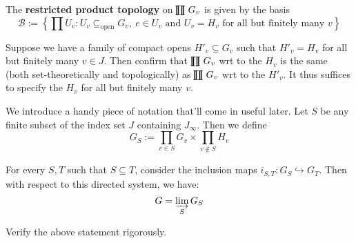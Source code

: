 \documentclass[11pt, x11names]{article}
\newcommand{\calb}{\mathcal{B}}
\newcommand{\inj}{\hookrightarrow}
\newcommand{\dlim}{\varinjlim}
\newcommand{\set}[1]{\left\{ #1 \right\}}
\newcommand{\rprod}{
    \mathrel{\ooalign{\hidewidth $\prod$ \hidewidth \cr $\coprod$}}
}
\begin{document}
\begin{defn}
    The \textbf{restricted product topology} on $\rprod G_v$ is given by the basis
    \begin{equation*}
        \calb := \set{\prod U_v : U_v \subseteq_{\text{open}} G_v, \ e \in U_v \text{ and } U_v = H_v \text{ for all but finitely many } v}
    \end{equation*}
\end{defn}

\begin{sanitycheck}
Suppose we have a family of compact opens $H'_v \subseteq G_v$ such that $H'_v = H_v$ for all but finitely many $v \in J$. Then confirm that $\rprod G_v$ wrt to the $H_v$ is the same (both set-theoretically and topologically) as $\rprod G_v$ wrt to the $H'_v$. It thus suffices to specify the $H_v$ for all but finitely many $v$.
\end{sanitycheck}

We introduce a handy piece of notation that'll come in useful later. Let $S$ be any finite subset of the index set $J$ containing $J_\infty$. Then we define
\begin{equation*}
    G_S := \prod_{v \in S} G_v \times \prod_{v \notin S} H_v
\end{equation*}

For every $S, T$ such that $S \subseteq T$, consider the inclusion maps $i_{S, T}: G_S \inj G_T$. Then with respect to this directed system, we have:
\begin{equation*}
    G = \dlim_{S} G_S
\end{equation*}

\begin{exercise}
\label{restricted product as colimit}
    Verify the above statement rigorously.
\end{exercise}
\end{document}
